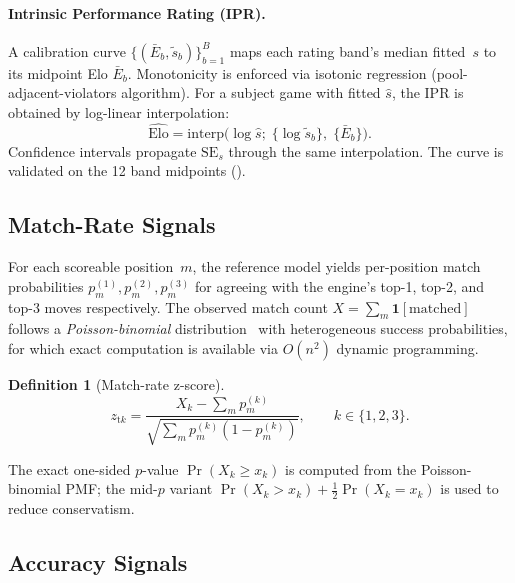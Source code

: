 \documentclass[11pt,a4paper]{article}
\theoremstyle{definition}
\newtheorem{definition}{Definition}
\begin{document}
\paragraph{Intrinsic Performance Rating (IPR).}
A calibration curve $\{(\bar{E}_b, \tilde{s}_b)\}_{b=1}^{B}$ maps each
rating band's median fitted~$s$ to its midpoint Elo $\bar{E}_b$.
Monotonicity is enforced via isotonic regression (pool-adjacent-violators
algorithm).  For a subject game with fitted $\hat{s}$, the IPR is
obtained by log-linear interpolation:
\begin{equation}
  \label{eq:ipr}
  \widehat{\mathrm{Elo}}
  = \mathrm{interp}\!\bigl(\log \hat{s};\;
      \{\log \tilde{s}_b\},\; \{\bar{E}_b\}\bigr).
\end{equation}
Confidence intervals propagate $\mathrm{SE}_s$ through the same
interpolation.  The curve is validated on the 12 band midpoints
().

\subsection{Match-Rate Signals}
\label{sec:matchrate}

For each scoreable position~$m$, the reference model yields per-position
match probabilities $p_m^{(1)}, p_m^{(2)}, p_m^{(3)}$ for agreeing with
the engine's top-1, top-2, and top-3 moves respectively.  The observed
match count $X = \sum_m \mathbf{1}[\text{matched}]$ follows a
\emph{Poisson-binomial} distribution~\citep{hong2013computing} with
heterogeneous success probabilities, for which exact computation is
available via $O(n^2)$ dynamic programming.

\begin{definition}[Match-rate z-score]
\label{def:zscore}
\begin{equation}
  \label{eq:matchz}
  z_{\mathrm{t}k} = \frac{X_k - \sum_m p_m^{(k)}}
    {\sqrt{\sum_m p_m^{(k)}(1 - p_m^{(k)})}},
  \qquad k \in \{1,2,3\}.
\end{equation}
\end{definition}

The exact one-sided $p$-value $\Pr(X_k \ge x_k)$ is computed from the
Poisson-binomial PMF; the mid-$p$ variant
$\Pr(X_k > x_k) + \tfrac{1}{2}\Pr(X_k = x_k)$ is used to reduce
conservatism.

\subsection{Accuracy Signals}
\label{sec:acpl}
\end{document}
